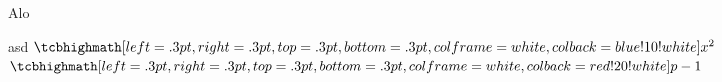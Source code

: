\begin{pregunta}
    \item Alo
    \begin{solucion}
        asd \(\hmath{x^2}\) \(\emath{p-1}\)
    \end{solucion}
\end{pregunta}
